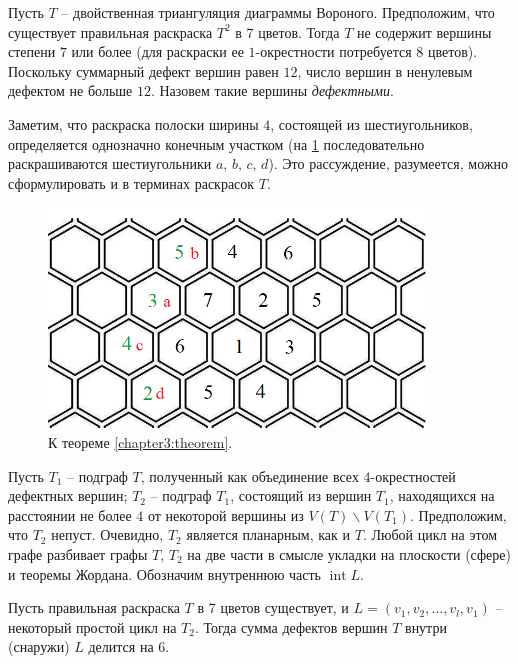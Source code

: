 \begin{myproof}
Пусть $T$ -- двойственная триангуляция диаграммы Вороного. 
Предположим, что существует правильная раскраска $T^2$ в $7$ цветов.
Тогда $T$ не содержит вершины  степени $7$ или более (для раскраски ее $1$-окрестности потребуется $8$ цветов).
Поскольку суммарный дефект вершин равен $12$, число вершин в ненулевым дефектом не больше $12$. 
Назовем такие вершины \textit{дефектными}.

Заметим, что раскраска полоски ширины $4$, состоящей из шестиугольников, определяется однозначно конечным участком 
(на \figurename{ \ref{chapter3:fig:hex_determ}} последовательно раскрашиваются шестиугольники $a,\,b,\,c,\,d$). 
Это рассуждение, разумеется, можно сформулировать и в терминах раскрасок $T$.

\begin{figure}[h]
\centering
\captionsetup{justification=centering}
\includegraphics[width=10cm]{chapters/chapter3/hex_determ.png}
\caption{К теореме \ref{chapter3:theorem}.}
\label{chapter3:fig:hex_determ}
\end{figure}

Пусть $T_1$ -- подграф $T$, полученный как объединение всех $4$-окрест\-нос\-тей дефектных вершин; 
$T_2$ -- подграф $T_1$, состоящий из вершин $T_1$, находящихся на расстоянии не более $4$ от некоторой вершины из 
$V(T) \backslash V(T_1)$. Предположим, что $T_2$ непуст. Очевидно, $T_2$ является планарным, как и $T$. 
Любой цикл на этом графе разбивает графы $T, \, T_2$ на две части в смысле укладки на плоскости (сфере) и теоремы Жордана. Обозначим внутреннюю часть $\operatorname{int} L$.

\begin{lemma}
Пусть правильная раскраска $T$ в 7 цветов существует, и $L=(v_1,v_2, \dots , v_l, v_1)$ -- некоторый простой цикл на $T_2$. 
Тогда сумма дефектов вершин $T$ внутри (снаружи) $L$ делится на 6.
\end{lemma}


\end{myproof}
